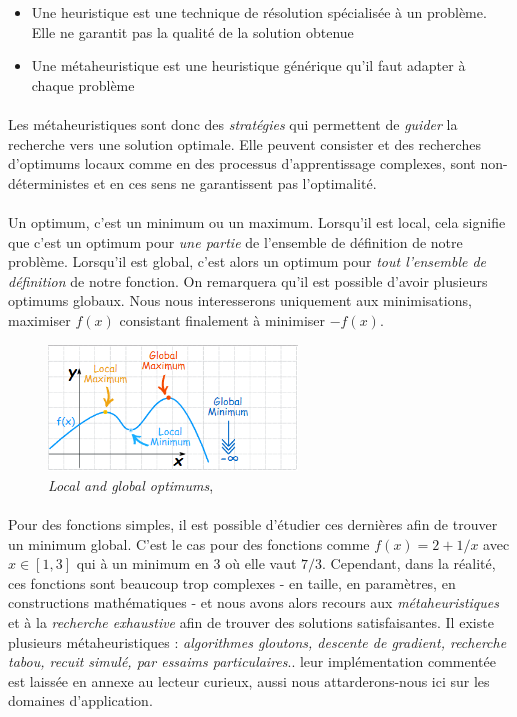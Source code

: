 \begin{itemize}
    \item Une heuristique est une technique de résolution spécialisée à un problème. Elle ne garantit pas la qualité de
    la solution obtenue
    \item Une métaheuristique est une heuristique générique qu’il faut adapter à chaque problème
\end{itemize}

\paragraph{} Les métaheuristiques sont donc des \emph{stratégies} qui permettent de \emph{guider} la recherche vers une
solution optimale. Elle peuvent consister et des recherches d'optimums locaux comme en des processus d'apprentissage complexes,
sont non-déterministes et en ces sens ne garantissent pas l'optimalité.

\paragraph{} Un optimum, c'est un minimum ou un maximum. Lorsqu'il est local, cela signifie que c'est un optimum pour \emph{une
partie} de l'ensemble de définition de notre problème. Lorsqu'il est global, c'est alors un optimum pour \emph{tout l'ensemble
de définition} de notre fonction. On remarquera qu'il est possible d'avoir plusieurs optimums globaux. Nous nous interesserons 
uniquement aux minimisations, maximiser $f(x)$ consistant finalement à minimiser $-f(x)$.

\begin{figure}[h]
    \centering
    \includegraphics[width=250px]{chapters/03/images/optimums.png}
    \caption{\label{optimums} \emph{Local and global optimums}, \cite{Optimums0}}
\end{figure}

\paragraph{} Pour des fonctions simples, il est possible d'étudier ces dernières afin de trouver un minimum global.
C'est le cas pour des fonctions comme $f(x) = 2 + 1/x$ avec $x \in [1, 3]$ qui à un minimum en 3 où elle vaut $7/3$.
Cependant, dans la réalité, ces fonctions sont beaucoup trop complexes - en taille, en paramètres, en constructions
mathématiques - et nous avons alors recours aux \emph{métaheuristiques} et à la \emph{recherche exhaustive} afin
de trouver des solutions satisfaisantes. Il existe plusieurs métaheuristiques : \emph{algorithmes gloutons, descente
de gradient, recherche tabou, recuit simulé, par essaims particulaires}.. leur implémentation commentée est laissée
en annexe au lecteur curieux, aussi nous attarderons-nous ici sur les domaines d'application.

